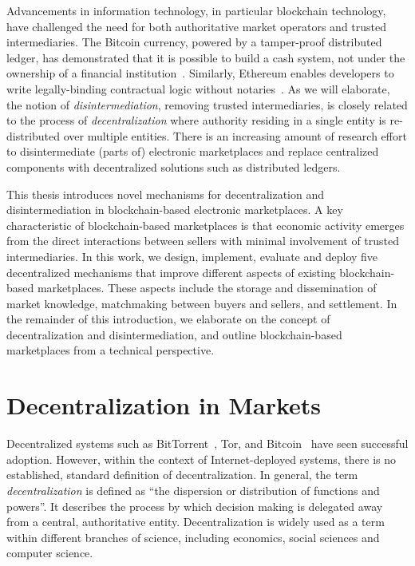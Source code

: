 Advancements in information technology, in particular blockchain technology, have challenged the need for both authoritative market operators and trusted intermediaries.
The Bitcoin currency, powered by a tamper-proof distributed ledger, has demonstrated that it is possible to build a cash system, not under the ownership of a financial institution~\cite{nakamoto2008bitcoin}.
Similarly, Ethereum enables developers to write legally-binding contractual logic without notaries~\cite{wood2014ethereum}.
As we will elaborate, the notion of \emph{disintermediation}, removing trusted intermediaries, is closely related to the process of \emph{decentralization} where authority residing in a single entity is re-distributed over multiple entities.
There is an increasing amount of research effort to disintermediate (parts of) electronic marketplaces and replace centralized components with decentralized solutions such as distributed ledgers.

This thesis introduces novel mechanisms for decentralization and disintermediation in blockchain-based electronic marketplaces.
A key characteristic of blockchain-based marketplaces is that economic activity emerges from the direct interactions between sellers with minimal involvement of trusted intermediaries.
In this work, we design, implement, evaluate and deploy five decentralized mechanisms that improve different aspects of existing blockchain-based marketplaces.
These aspects include the storage and dissemination of market knowledge, matchmaking between buyers and sellers, and settlement.
In the remainder of this introduction, we elaborate on the concept of decentralization and disintermediation, and outline blockchain-based marketplaces from a technical perspective.

\section{Decentralization in Markets}
\label{sec:decentralization}
Decentralized systems such as BitTorrent~\cite{pouwelse2005bittorrent}, Tor, and Bitcoin~\cite{nakamoto2008bitcoin} have seen successful adoption.
However, within the context of Internet-deployed systems, there is no established, standard definition of decentralization.
In general, the term \emph{decentralization} is defined as \enquote{the dispersion or distribution of functions and powers}.
It describes the process by which decision making is delegated away from a central, authoritative entity.
Decentralization is widely used as a term within different branches of science, including economics, social sciences and computer science.

